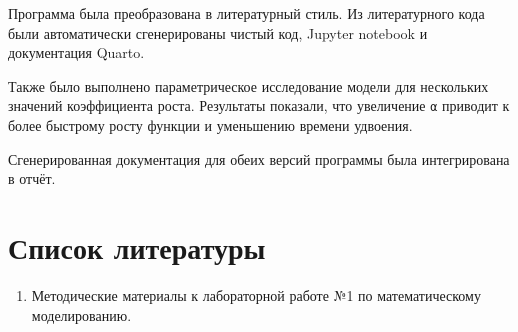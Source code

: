 \documentclass[
  russian,
  12pt,
  a4paper,
  DIV=11,
  numbers=noendperiod]{scrreprt}
\providecommand{\tightlist}{%
  \setlength{\itemsep}{0pt}\setlength{\parskip}{0pt}}
\begin{document}
Программа была преобразована в литературный стиль. Из литературного кода
были автоматически сгенерированы чистый код, Jupyter notebook и
документация Quarto.

Также было выполнено параметрическое исследование модели для нескольких
значений коэффициента роста. Результаты показали, что увеличение
\texttt{α} приводит к более быстрому росту функции и уменьшению времени
удвоения.

Сгенерированная документация для обеих версий программы была
интегрирована в отчёт.

\chapter*{Список
литературы}\label{ux441ux43fux438ux441ux43eux43a-ux43bux438ux442ux435ux440ux430ux442ux443ux440ux44b}

\begin{enumerate}
\def\labelenumi{\arabic{enumi}.}
\tightlist
\item
  Методические материалы к лабораторной работе №1 по математическому
  моделированию.
\end{enumerate}
\end{document}

